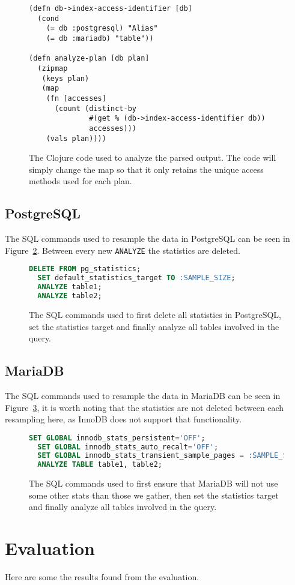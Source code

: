 \begin{figure}[ht]
\begin{verbatim}
(defn db->index-access-identifier [db]
  (cond
    (= db :postgresql) "Alias"
    (= db :mariadb) "table"))

(defn analyze-plan [db plan]
  (zipmap
   (keys plan)
   (map
    (fn [accesses]
      (count (distinct-by
              #(get % (db->index-access-identifier db))
              accesses)))
    (vals plan))))
   \end{verbatim}
   \caption[The clojure code to analyze a query]{The Clojure code used to
     analyze the parsed output. The code will simply change the map so that it
     only retains the unique access methods used for each plan.}
\label{fig:clj:analyzing}
\end{figure}

\subsection{PostgreSQL}
The SQL commands used to resample the data in PostgreSQL can be seen in
Figure~\ref{fig:sql:pganalyze}. Between every new \texttt{ANALYZE} the statistics
are deleted.

\begin{figure}[ht]
\begin{lstlisting}[language=SQL]
  DELETE FROM pg_statistics;
  SET default_statistics_target TO :SAMPLE_SIZE;
  ANALYZE table1;
  ANALYZE table2;
\end{lstlisting}
\caption[The SQL commands used to resample inPostgreSQL.]{The SQL commands used
  to first delete all statistics in PostgreSQL, set the statistics target and
  finally analyze all tables involved in the query.}
\label{fig:sql:pganalyze}
\end{figure}

\subsection{MariaDB}
The SQL commands used to resample the data in MariaDB can be seen in
Figure~\ref{fig:sql:resamplemdb}, it is worth noting that the statistics are not
deleted between each resampling here, as InnoDB does not support that functionality.

\begin{figure}[ht]
\begin{lstlisting}[language=SQL]
  SET GLOBAL innodb_stats_persistent='OFF';
  SET GLOBAL innodb_stats_auto_recalt='OFF';
  SET GLOBAL innodb_stats_transient_sample_pages = :SAMPLE_SIZE;
  ANALYZE TABLE table1, table2;
\end{lstlisting}
\caption[The SQL commands used to resample in MariaDB.]{The SQL commands used to
first ensure that MariaDB will not use some other stats than those we gather,
then set the statistics target and finally analyze all tables involved in the query.}
\label{fig:sql:resamplemdb}
\end{figure}

\section{Evaluation}
Here are some the results found from the evaluation.